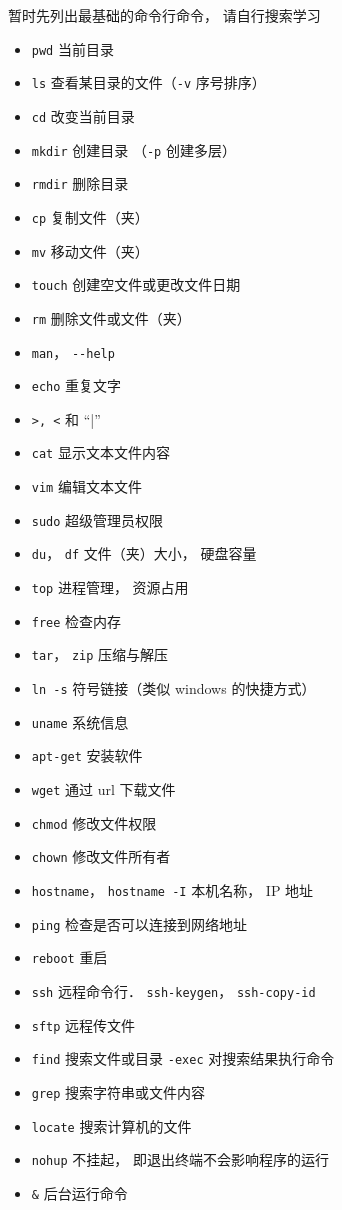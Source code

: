 暂时先列出最基础的命令行命令， 请自行搜索学习
\begin{itemize}
\item \verb|pwd| 当前目录
\item \verb|ls| 查看某目录的文件（\verb|-v| 序号排序）
\item \verb|cd| 改变当前目录
\item \verb|mkdir| 创建目录 （\verb|-p| 创建多层）
\item \verb|rmdir| 删除目录
\item \verb|cp| 复制文件（夹）
\item \verb|mv| 移动文件（夹）
\item \verb|touch| 创建空文件或更改文件日期
\item \verb|rm| 删除文件或文件（夹）
\item \verb|man|， \verb|--help|
\item \verb|echo| 重复文字
\item \verb|>, <| 和 “|”
\item \verb|cat| 显示文本文件内容
\item \verb|vim| 编辑文本文件
\item \verb|sudo| 超级管理员权限
\item \verb|du|， \verb|df| 文件（夹）大小， 硬盘容量
\item \verb|top| 进程管理， 资源占用
\item \verb|free| 检查内存
\item \verb|tar|， \verb|zip| 压缩与解压
\item \verb|ln -s| 符号链接（类似 windows 的快捷方式）
\item \verb|uname| 系统信息
\item \verb|apt-get| 安装软件
\item \verb|wget| 通过 url 下载文件
\item \verb|chmod| 修改文件权限
\item \verb|chown| 修改文件所有者
\item \verb|hostname|， \verb|hostname -I| 本机名称， IP 地址
\item \verb|ping| 检查是否可以连接到网络地址
\item \verb|reboot| 重启
\item \verb|ssh| 远程命令行． \verb|ssh-keygen|， \verb|ssh-copy-id|
\item \verb|sftp| 远程传文件
\item \verb|find| 搜索文件或目录 \verb|-exec| 对搜索结果执行命令
\item \verb|grep| 搜索字符串或文件内容
\item \verb|locate| 搜索计算机的文件
\item \verb|nohup| 不挂起， 即退出终端不会影响程序的运行
\item \verb|&| 后台运行命令
\end{itemize}

